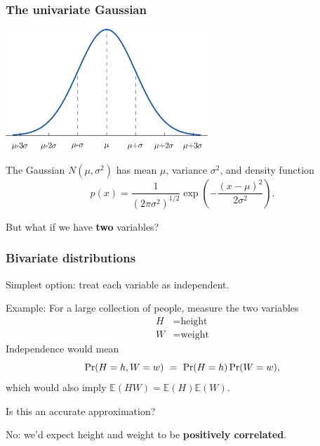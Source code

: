 \documentclass[smaller]{beamer}
\def\E{{\mathbb E}}
\def\darkred{\color{red!70!black}}
\def\v2{{\vskip.2in}}
\def\E{{\mathbb E}}
\def\pr{{\mbox{\rm Pr}}}
\begin{document}
\begin{frame}
\frametitle{The univariate Gaussian}

\begin{center}
\includegraphics[width=3in]{gaussian1.jpg}
\end{center}

The Gaussian $N(\mu, \sigma^2)$ has mean $\mu$, variance $\sigma^2$, and density function
$$ p(x) = \frac{1}{(2\pi \sigma^2)^{1/2}} \exp \left( - \frac{(x-\mu)^2}{2\sigma^2} \right) .$$

\pause
\alert{But what if we have {\bf two} variables?}

\end{frame}

\begin{frame}
\frametitle{Bivariate distributions}

{\darkred Simplest option: treat each variable as independent.}

\pause\v2
Example: For a large collection of people, measure the two variables
\begin{align*}
H &= \mbox{height} \\
W &= \mbox{weight}
\end{align*}
Independence would mean
$$ \pr(H = h, W = w) \ = \ \pr(H=h) \, \pr(W=w) ,$$
which would also imply $\E(HW) = \E(H) \E(W)$.
 
\pause\v2
\alert{Is this an accurate approximation?}
\pause

\alert{No: we'd expect height and weight to be {\bf positively correlated}.}

\end{frame}
\end{document}
